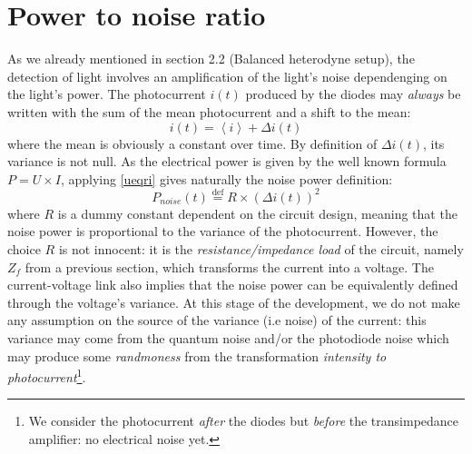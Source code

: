 \documentclass[11pt]{report}
\begin{document}
\section{Power to noise ratio}

As we already mentioned in section 2.2 (Balanced heterodyne setup), the detection of light involves an amplification of the light's noise dependenging on the light's power. The photocurrent $i(t)$ produced by the diodes may \textit{always} be written with the sum of the mean photocurrent and a shift to the mean:
\begin{equation}
\label{i_split_delta_i}
i(t) = \left\langle i \right\rangle + \Delta i(t)
\end{equation}
where the mean is obviously a constant over time. By definition of $\Delta i(t)$, its variance is not null. As the electrical power is given by the well known formula $P = U \times I$, applying \eqref{ueqri} gives naturally the noise power definition:
\begin{equation}
\label{def_p_noise}
P_{noise}(t) \stackrel{\text{def}}{=} R \times (\Delta i(t))^2 
\end{equation}
where $R$ is a dummy constant dependent on the circuit design, meaning that the noise power is proportional to the variance of the photocurrent. However, the choice $R$ is not innocent: it is the \textit{resistance/impedance load} of the circuit, namely $Z_f$ from a previous section, which transforms the current into a voltage. The current-voltage link also implies that the noise power can be equivalently defined through the voltage's variance. At this stage of the development, we do not make any assumption on the source of the variance (i.e noise) of the current: this variance may come from the quantum noise and/or the photodiode noise which may produce some \textit{randmoness} from the transformation \textit{intensity to photocurrent}\footnote{We consider the photocurrent \textit{after} the diodes but \textit{before} the transimpedance amplifier: no electrical noise yet.}.
\end{document}
